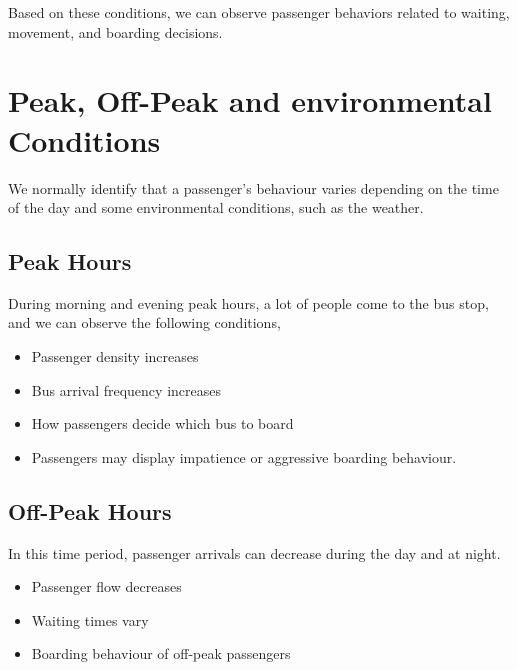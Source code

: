 \documentclass[12pt,a4paper]{report}
\begin{document}
Based on these conditions, we can observe passenger behaviors related to waiting, movement, and boarding decisions.


\section{Peak,  Off-Peak and environmental Conditions}

We normally identify that a passenger’s behaviour varies depending on the time of the day and some environmental conditions, such as the weather.

\subsection{Peak Hours}

During morning and evening peak hours, a lot of people come to the bus stop, and we can observe the following conditions,

\begin{itemize}[noitemsep]

\item Passenger density increases

\item Bus arrival frequency increases

\item How passengers decide which bus to board

\item Passengers may display impatience or aggressive boarding behaviour.

\end{itemize}


\subsection{Off-Peak Hours}

In this time period, passenger arrivals can decrease during the day and at night.

\begin{itemize}[noitemsep]

\item Passenger flow decreases

\item Waiting times vary 

\item Boarding behaviour of off-peak passengers


\end{itemize}
\end{document}

